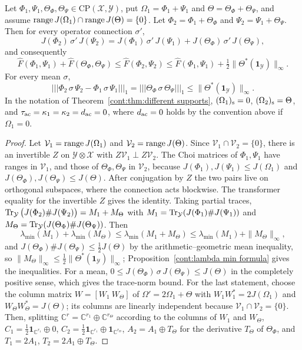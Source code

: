 \begin{corollary}\label{cont:cor:independent branch}
Let $\Phi_1,\Psi_1,\Theta_\Phi,\Theta_\Psi\in\mathrm{CP}(\mathcal{X},\mathcal{Y})$, put $\Omega_1=\Phi_1+\Psi_1$ and $\Theta=\Theta_\Phi+\Theta_\Psi$, and assume $\operatorname{range} J(\Omega_1)\cap\operatorname{range} J(\Theta)=\{0\}$. Let $\Phi_2=\Phi_1+\Theta_\Phi$ and $\Psi_2=\Psi_1+\Theta_\Psi$. Then for every operator connection $\sigma'$,
\[
J(\Phi_2)\,\sigma'\,J(\Psi_2)=J(\Phi_1)\,\sigma'\,J(\Psi_1)+J(\Theta_\Phi)\,\sigma'\,J(\Theta_\Psi),
\]
and consequently
\[
\widehat F(\Phi_1,\Psi_1)+\widehat F(\Theta_\Phi,\Theta_\Psi)\leq\widehat F(\Phi_2,\Psi_2)\leq\widehat F(\Phi_1,\Psi_1)+\tfrac12\|\Theta^*(\mathbf{1}_{\mathcal{Y}})\|_\infty .
\]
For every mean $\sigma$,
\[
|||\Phi_2\,\sigma\,\Psi_2-\Phi_1\,\sigma\,\Psi_1|||_1=|||\Theta_\Phi\,\sigma\,\Theta_\Psi|||_1\leq\|\Theta^*(\mathbf{1}_{\mathcal{Y}})\|_\infty.
\]
In the notation of Theorem~\ref{cont:thm:different supports}, $(\Omega_1)_{\rm s}=0$, $(\Omega_2)_{\rm s}=\Theta$, and $\tau_{\rm ac}=\kappa_1=\kappa_2=d_{\rm ac}=0$, where $d_{\rm ac}=0$ holds by the convention above if $\Omega_1=0$.
\end{corollary}

\begin{proof}
Let $\mathcal{V}_1=\operatorname{range} J(\Omega_1)$ and $\mathcal{V}_2=\operatorname{range} J(\Theta)$. Since $\mathcal{V}_1\cap\mathcal{V}_2=\{0\}$, there is an invertible $Z$ on $\mathcal{Y}\otimes\mathcal{X}$ with $Z\mathcal{V}_1\perp Z\mathcal{V}_2$. The Choi matrices of $\Phi_1,\Psi_1$ have ranges in $\mathcal{V}_1$, and those of $\Theta_\Phi,\Theta_\Psi$ in $\mathcal{V}_2$, because $J(\Phi_1),J(\Psi_1)\leq J(\Omega_1)$ and $J(\Theta_\Phi),J(\Theta_\Psi)\leq J(\Theta)$. After conjugation by $Z$ the two pairs live on orthogonal subspaces, where the connection acts blockwise. The transformer equality for the invertible $Z$ gives the identity. Taking partial traces, $\operatorname{Tr}_{\mathcal{Y}}\big(J(\Phi_2)\#J(\Psi_2)\big)=M_1+M_\Theta$ with $M_1=\operatorname{Tr}_{\mathcal{Y}}(J(\Phi_1)\#J(\Psi_1))$ and $M_\Theta=\operatorname{Tr}_{\mathcal{Y}}(J(\Theta_\Phi)\#J(\Theta_\Psi))$. Then
\[
\lambda_{\min}(M_1)+\lambda_{\min}(M_\Theta)\leq\lambda_{\min}(M_1+M_\Theta)\leq\lambda_{\min}(M_1)+\|M_\Theta\|_\infty,
\]
and $J(\Theta_\Phi)\#J(\Theta_\Psi)\leq\frac12J(\Theta)$ by the arithmetic--geometric mean inequality, so $\|M_\Theta\|_\infty\leq\frac12\|\Theta^*(\mathbf{1}_{\mathcal{Y}})\|_\infty$; Proposition~\ref{cont:lambda min formula} gives the inequalities. For a mean, $0\leq J(\Theta_\Phi)\,\sigma\,J(\Theta_\Psi)\leq J(\Theta)$ in the completely positive sense, which gives the trace-norm bound. For the last statement, choose the column matrix $W=[W_1\ W_\Theta]$ of $\Omega'=2\Omega_1+\Theta$ with $W_1W_1^*=2J(\Omega_1)$ and $W_\Theta W_\Theta^*=J(\Theta)$; its columns are linearly independent because $\mathcal{V}_1\cap\mathcal{V}_2=\{0\}$. Then, splitting $\mathbb{C}^r=\mathbb{C}^{r_1}\oplus\mathbb{C}^{r_\Theta}$ according to the columns of $W_1$ and $W_\Theta$, $C_1=\frac12\mathbf{1}_{\mathbb{C}^{r_1}}\oplus0$, $C_2=\frac12\mathbf{1}_{\mathbb{C}^{r_1}}\oplus\mathbf{1}_{\mathbb{C}^{r_\Theta}}$, $A_2=A_1\oplus T_\Theta$ for the derivative $T_\Theta$ of $\Theta_\Phi$, and $T_1=2A_1$, $T_2=2A_1\oplus T_\Theta$.
\end{proof}


